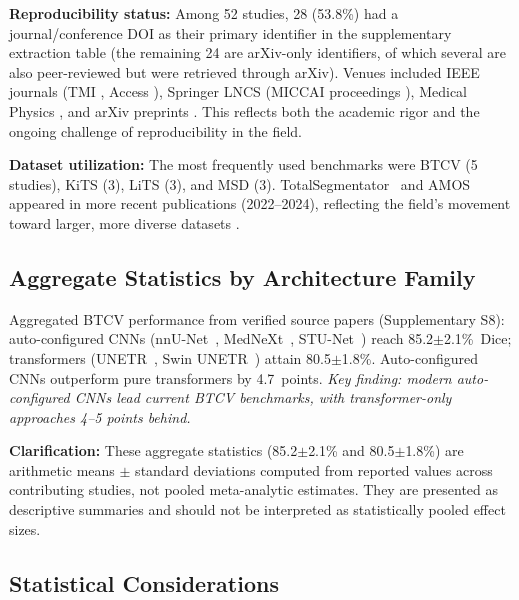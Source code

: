 \documentclass[conference]{IEEEtran}
\begin{document}
\textbf{Reproducibility status:} Among 52 studies, 28 (53.8\%) had a journal/conference DOI as their primary identifier in the supplementary extraction table (the remaining 24 are arXiv-only identifiers, of which several are also peer-reviewed but were retrieved through arXiv). Venues included IEEE journals (TMI \cite{gibson2018densevnet}, Access \cite{qayyum2020aspp}), Springer LNCS (MICCAI proceedings \cite{kakeya2018ujapa}), Medical Physics \cite{zhu2019anatomynet, ma2019bladder, liu2020attention, amjad2022general}, and arXiv preprints \cite{nikolov2021clinically, han2023scribble}. This reflects both the academic rigor and the ongoing challenge of reproducibility in the field.

\textbf{Dataset utilization:} The most frequently used benchmarks were BTCV (5 studies), KiTS \cite{zhao2020mss, myronenko2019boundary} (3), LiTS \cite{humady2022liver, kavur2020ensemble} (3), and MSD \cite{sitala2020autoencoder, rahman2023sigmoid} (3). TotalSegmentator~\cite{wasserthal2023totalsegmentator} and AMOS~\cite{amos2022} appeared in more recent publications (2022--2024), reflecting the field's movement toward larger, more diverse datasets \cite{luo2024raos, ji2023continual}.

\subsection{Aggregate Statistics by Architecture Family}

Aggregated BTCV performance from verified source papers (Supplementary S8): auto-configured CNNs (nnU-Net~\cite{isensee2021nnunet}, MedNeXt~\cite{roy2023mednext}, STU-Net~\cite{huang2023stunet}) reach 85.2$\pm$2.1\%~Dice; transformers (UNETR~\cite{hatamizadeh2022unetr}, Swin UNETR~\cite{swinunetr2022}) attain 80.5$\pm$1.8\%. Auto-configured CNNs outperform pure transformers by 4.7~points. \emph{Key finding: modern auto-configured CNNs lead current BTCV benchmarks, with transformer-only approaches 4--5 points behind.}

\textbf{Clarification:} These aggregate statistics (85.2$\pm$2.1\% and 80.5$\pm$1.8\%) are arithmetic means $\pm$ standard deviations computed from reported values across contributing studies, not pooled meta-analytic estimates. They are presented as descriptive summaries and should not be interpreted as statistically pooled effect sizes.

\subsection{Statistical Considerations}
\end{document}
